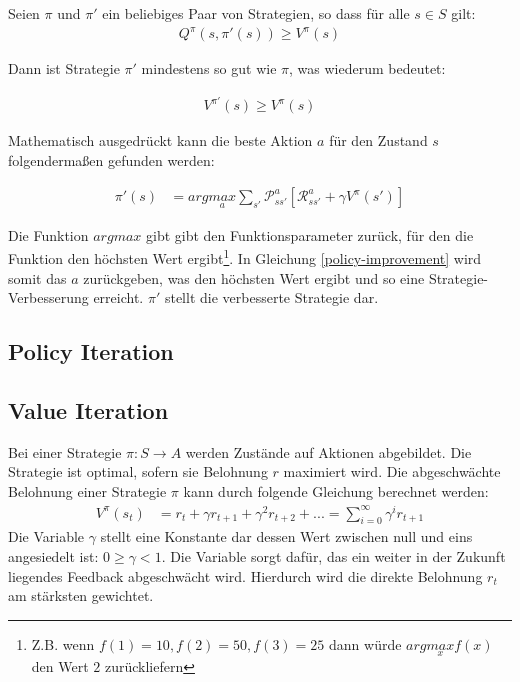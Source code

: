 \documentclass[10pt]{scrartcl}
\begin{document}
Seien $\pi$ und $\pi'$ ein beliebiges Paar von Strategien, so dass für alle $s \in S$ gilt:
\begin{align*}
Q^\pi(s,\pi'(s)) \ge V^\pi(s)
\end{align*}

Dann ist Strategie $\pi'$  mindestens so gut wie $\pi$, was wiederum bedeutet:

\begin{align*}
V^{\pi'}(s) \ge V^\pi(s)
\end{align*}

Mathematisch ausgedrückt kann die beste Aktion $a$ für den Zustand $s$ folgendermaßen gefunden werden:

\begin{align}\label{policy-improvement}
\pi'(s) &= arg\underset{a}{max}\sum_{s'}\mathcal{P}^a_{ss'}[\mathcal{R}^a_{ss'}+\gamma V^\pi(s')]
\end{align}

Die Funktion $argmax$ gibt gibt den Funktionsparameter zurück, für den die Funktion den höchsten Wert ergibt\footnote{Z.B. wenn $f(1)=10, f(2) = 50, f(3) = 25$ dann würde $arg\underset{x}{max}f(x)$ den Wert $2$ zurückliefern}. In Gleichung \ref{policy-improvement} wird somit das $a$ zurückgeben, was den höchsten Wert ergibt und so eine Strategie-Verbesserung erreicht. $\pi'$ stellt die verbesserte Strategie dar.

\subsection{Policy Iteration}
\subsection{Value Iteration}
Bei einer Strategie $\pi : S \rightarrow A $ werden Zustände auf Aktionen abgebildet. Die Strategie ist optimal, sofern sie Belohnung $r$ maximiert wird. Die abgeschwächte Belohnung einer Strategie $\pi$ kann durch folgende Gleichung berechnet werden:
\begin{align}\label{gleichungvp}
V^{\pi}(s_t) &= r_t + \gamma r_{t+1} + \gamma^2r_{t+2} + ... = \sum^{\infty}_{i=0} \gamma^ir_{t+1}
\end{align}
Die Variable $\gamma$ stellt eine Konstante dar dessen Wert zwischen null und eins angesiedelt ist: $0 \geq \gamma < 1$. Die Variable sorgt dafür, das ein weiter in der Zukunft liegendes Feedback abgeschwächt wird. Hierdurch wird die direkte Belohnung $r_t$ am stärksten gewichtet.
\end{document}
